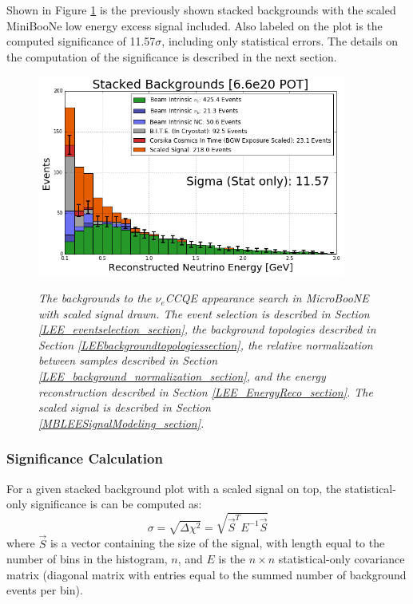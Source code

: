 Shown in Figure \ref{LEE_perfectreco_fullstack_fig} is the previously shown stacked backgrounds with the scaled MiniBooNe low energy excess signal included. Also labeled on the plot is the computed significance of 11.57$\sigma$, including only statistical errors. The details on the computation of the significance is described in the next section.

\begin{figure}[ht!]
\centering
\includegraphics[width=0.9\textwidth]{Figures/LEE_perfectreco_fullstack_WithAnalysisCuts.png}\\
\caption{\textit{The backgrounds to the $\nu_e$CCQE appearance search in MicroBooNE with scaled signal drawn. The event selection is described in Section \ref{LEE_eventselection_section}, the background topologies described in Section \ref{LEEbackgroundtopologiessection}, the relative normalization between samples described in Section \ref{LEE_background_normalization_section}, and the energy reconstruction described in Section \ref{LEE_EnergyReco_section}. The scaled signal is described in Section \ref{MBLEESignalModeling_section}.}}
\label{LEE_perfectreco_fullstack_fig}
\end{figure}

\subsubsection{Significance Calculation}
For a given stacked background plot with a scaled signal on top, the statistical-only significance is can be computed as:
\begin{equation}\label{chisquaresigeqtn}
\sigma = \sqrt{\Delta \chi^2} = \sqrt{\vec{S}^TE^{-1}\vec{S}}
\end{equation}
where $\vec{S}$ is a vector containing the size of the signal, with length equal to the number of bins in the histogram, $n$, and $E$ is the $n\times n$ statistical-only covariance matrix (diagonal matrix with entries equal to the summed number of background events per bin).


